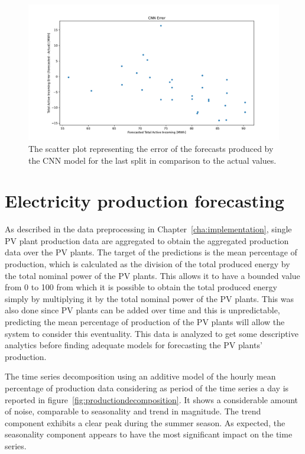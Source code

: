 \begin{figure}[H]
\centering
\includegraphics[width=1\textwidth]{images/demand/CNN_error_scatter_plot_predicted_daily_aggregated}
\caption{The scatter plot representing the error of the forecasts produced by the CNN model for the last split in comparison to the actual values.}
\label{fig:demandcnndailyforecastsscatterplot}
\end{figure}


\section{Electricity production forecasting}
\label{sec:productionval}
\vspace{0.2 cm}

As described in the data preprocessing in Chapter~\ref{cha:implementation}, single PV plant production data are aggregated to obtain the aggregated production data over the PV plants.
The target of the predictions is the mean percentage of production, which is calculated as the division of the total produced energy by the total nominal power of the PV plants.
This allows it to have a bounded value from 0 to 100 from which it is possible to obtain the total produced energy simply by multiplying it by the total nominal power of the PV plants.
This was also done since PV plants can be added over time and this is unpredictable, predicting the mean percentage of production of the PV plants will allow the system to consider this eventuality.
This data is analyzed to get some descriptive analytics before finding adequate models for forecasting the PV plants’ production.

The time series decomposition using an additive model of the hourly mean percentage of production data considering as period of the time series a day is reported in figure~\ref{fig:productiondecomposition}.
It shows a considerable amount of noise, comparable to seasonality and trend in magnitude.
The trend component exhibits a clear peak during the summer season.
As expected, the seasonality component appears to have the most significant impact on the time series.


